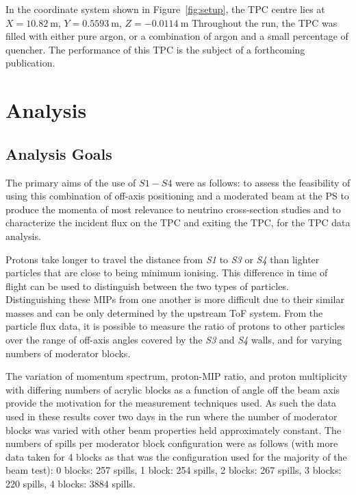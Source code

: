 In the coordinate system shown in Figure~\ref{fig:setup}, the TPC centre lies at $X=10.82~\text{m}$, $Y=0.5593~\text{m}$, $Z=-0.0114~\text{m}$
Throughout the run, the TPC was filled with either pure argon, or a combination of argon and a small percentage of quencher. 
The performance of this TPC is the subject of a forthcoming publication.

\section{Analysis}
\subsection{Analysis Goals}
The primary aims of the use of $\mathit{S1} - \mathit{S4}$ were as follows: to assess the feasibility of using this combination of off-axis positioning and a moderated beam at the PS to produce the momenta of most relevance to neutrino cross-section studies and to characterize the incident flux on the TPC and exiting the TPC, for the TPC data analysis.

Protons take longer to travel the distance from \textit{S1} to \textit{S3} or \textit{S4} than lighter particles that are close to being minimum ionising.
This difference in time of flight can be used to distinguish between the two types of particles.
Distinguishing these MIPs from one another is more difficult due to their similar masses and can be only determined by the upstream ToF system.
From the particle flux data, it is possible to measure the ratio of protons to other particles over the range of off-axis angles covered by the \textit{S3} and \textit{S4} walls, and for varying numbers of moderator blocks.

The variation of momentum spectrum, proton-MIP ratio, and proton multiplicity with differing numbers of acrylic blocks as a function of angle off the beam axis provide the motivation for the measurement techniques used.
As such the data used in these results cover two days in the run where the number of moderator blocks was varied with other beam properties held approximately constant.
The numbers of spills per moderator block configuration were as follows (with more data taken for 4 blocks as that was the configuration used for the majority of the beam test): 0 blocks: 257 spills, 1 block:  254 spills, 2 blocks: 267 spills, 3 blocks: 220 spills, 4 blocks: 3884 spills.


